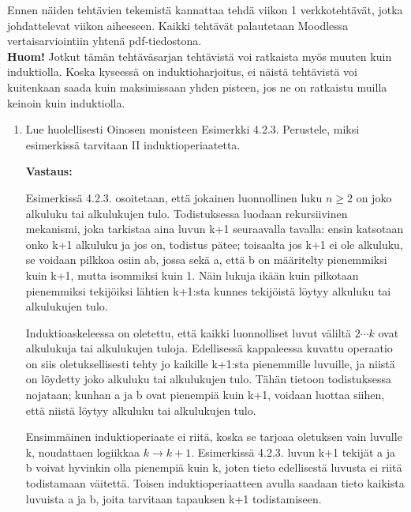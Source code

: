 \documentclass[a4paper,12pt]{article}
\begin{document}
 

\otsikko

Ennen n\"aiden teht\"avien tekemist\"a kannattaa tehd\"a viikon 1 verkkoteht\"av\"at, jotka johdattelevat viikon aiheeseen.
Kaikki teht\"av\"at palautetaan Moodlessa vertaisarviointiin yhten\"a pdf-tiedostona. \\

\textbf{Huom!} Jotkut t\"am\"an teht\"av\"asarjan teht\"avist\"a voi ratkaista my\"os muuten kuin induktiolla. Koska kyseess\"a on induktioharjoitus, ei n\"aist\"a teht\"avist\"a voi kuitenkaan saada kuin maksimissaan yhden pisteen, jos ne on ratkaistu muilla keinoin kuin induktiolla. \\

\begin{enumerate}

\item Lue huolellisesti Oinosen monisteen Esimerkki 4.2.3. Perustele, miksi esimerkiss\"a tarvitaan II induktioperiaatetta. 

\textbf{Vastaus:}

Esimerkissä 4.2.3. osoitetaan, että jokainen luonnollinen luku $n \geq 2$ on joko alkuluku tai alkulukujen tulo. Todistuksessa luodaan rekursiivinen mekanismi, joka tarkistaa aina luvun k+1 seuraavalla tavalla: ensin katsotaan onko k+1 alkuluku ja jos on, todistus pätee; toisaalta jos k+1 ei ole alkuluku, se voidaan pilkkoa osiin ab, jossa sekä a, että b on määritelty pienemmiksi kuin k+1, mutta isommiksi kuin 1. Näin lukuja ikään kuin pilkotaan pienemmiksi tekijöiksi lähtien k+1:sta kunnes tekijöistä löytyy alkuluku tai alkulukujen tulo. 

Induktioaskeleessa on oletettu, että kaikki luonnolliset luvut väliltä $2\cdots k$ ovat alkulukuja tai alkulukujen tuloja. Edellisessä kappaleessa kuvattu operaatio on siis oletuksellisesti tehty jo kaikille k+1:sta pienemmille luvuille, ja niistä on löydetty joko alkuluku tai alkulukujen tulo. Tähän tietoon todistuksessa nojataan; kunhan a ja b ovat pienempiä kuin k+1, voidaan luottaa siihen, että niistä löytyy alkuluku tai alkulukujen tulo. 

Ensimmäinen induktioperiaate ei riitä, koska se tarjoaa oletuksen vain luvulle k, noudattaen logiikkaa $k\rightarrow k+1$. Esimerkissä 4.2.3. luvun k+1 tekijät a ja b voivat hyvinkin olla pienempiä kuin k, joten tieto edellisestä luvusta ei riitä todistamaan väitettä. Toisen induktioperiaatteen avulla saadaan tieto kaikista luvuista a ja b, joita tarvitaan tapauksen k+1 todistamiseen. 


\end{enumerate}
\end{document}
